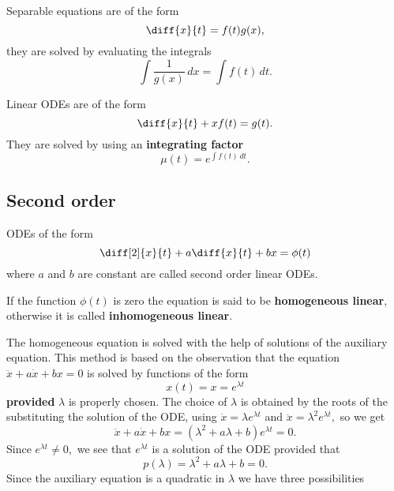 \documentclass[12pt, a4paper]{article}
\begin{document}
\begin{theorem}
    Separable equations are of the form 
    \[\diff{x}{t} = f(t)g(x),\]
    they are solved by evaluating the integrals
    \[\int \frac{1}{g(x)} \, dx = \int f(t) \, dt.\]
\end{theorem}

\begin{theorem}
    Linear ODEs are of the form 
    \[\diff{x}{t} +xf(t) =g(t).\]
    They are solved by using an \textbf{integrating factor} 
    \[\mu(t)= e^{\int f(t) \, dt}.\]
\end{theorem}

\subsection{Second order}

\begin{definition}
    ODEs of the form 
    \[\diff[2]{x}{t} + a \diff{x}{t}+ bx = \phi(t)\]
    where \(a\) and \(b\) are constant are called second order linear ODEs.
\end{definition}

\begin{definition}
    If the function \(\phi(t)\) is zero the equation is said to be \textbf{homogeneous linear}, otherwise it is called \textbf{inhomogeneous linear}.
\end{definition}

The homogeneous equation is solved with the help of solutions of the auxiliary equation. This method is based on the observation that the equation $\ddot{x}+a\dot{x}+bx=0$ is solved by functions of the form $$x(t)=x=e^{\lambda t}$$ \textbf{provided} $\lambda$ is properly chosen. The choice of $\lambda$ is obtained by the roots of the substituting the solution of the ODE, using $\dot{x}=\lambda e^{\lambda t}$ and $\ddot{x}=\lambda^2 e^{\lambda t},$ so we get $$\ddot{x}+a\dot{x}+bx=(\lambda^2+a\lambda+b)e^{\lambda t}=0.$$ Since $e^{\lambda t} \neq 0,$ we see that $e^{\lambda t}$ is a solution of the ODE provided that $$p(\lambda)=\lambda^2+a\lambda+b=0.$$ Since the auxiliary equation is a quadratic in $\lambda$ we have three possibilities 
\end{document}
